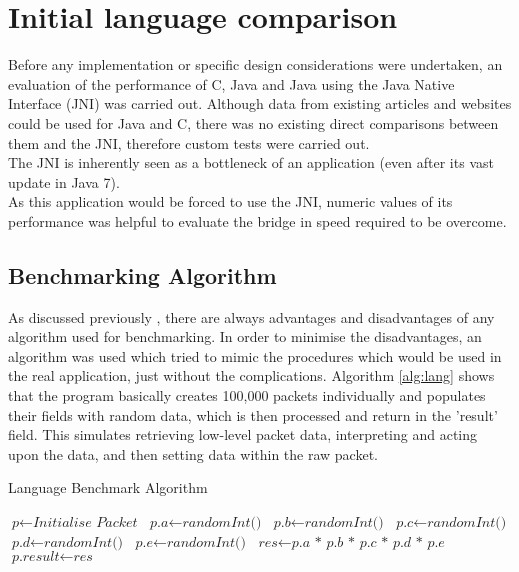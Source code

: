 \documentclass[final_report.tex]{subfiles}
\begin{document}
\section{Initial language comparison}
Before any implementation or specific design considerations were undertaken, an evaluation of the performance of C, Java and Java using the Java Native Interface (JNI) was carried out. Although data from existing articles and websites could be used for Java and C, there was no existing direct comparisons between them and the JNI, therefore custom tests were carried out. \\
\newline
The JNI is inherently  seen as a bottleneck of an application (even after its vast update in Java 7).  \\
\newline
As this application would be forced to use the JNI, numeric values of its performance was helpful to evaluate the bridge in speed required to be overcome.

\subsection{Benchmarking Algorithm}
As discussed previously , there are always advantages and disadvantages of any algorithm used for benchmarking. In order to minimise the disadvantages, an algorithm was used which tried to mimic the procedures which would be used in the real application, just without the complications. Algorithm \ref{alg:lang} shows that the program basically creates 100,000 packets individually and populates their fields with random data, which is then processed and return in the 'result' field. This simulates retrieving low-level packet data, interpreting and acting upon the data, and then setting data within the raw packet.

\begin{algorithm}[H]
	\caption{Language Benchmark Algorithm}\label{alg:lang}
	\begin{algorithmic}[1]
				\State $\textit{p} \gets \textit{Initialise Packet}$
				\State {}
				\State {}
			\EndFor
		\EndFunction
		\newline
		 
			\State $\textit{p.a} \gets \textit{randomInt()}$
			\State $\textit{p.b} \gets \textit{randomInt()}$
			\State $\textit{p.c} \gets \textit{randomInt()}$
			\State $\textit{p.d} \gets \textit{randomInt()}$
			\State $\textit{p.e} \gets \textit{randomInt()}$
		\EndFunction
		\newline
		 
			\State $\textit{res} \gets \textit{p.a * p.b * p.c * p.d * p.e}$
			\State $\textit{p.result} \gets \textit{res}$
		\EndFunction
	\end{algorithmic}
\end{algorithm}
\end{document}

